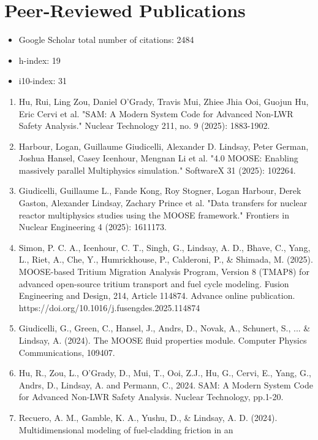 \section{Peer-Reviewed Publications}
\begin{itemize}
\item Google Scholar total number of citations: 2484
\item h-index: 19
\item i10-index: 31
\end{itemize}

\begin{enumerate}
  \item Hu, Rui, Ling Zou, Daniel O’Grady, Travis Mui, Zhiee Jhia Ooi, Guojun Hu, Eric Cervi et al. "SAM: A Modern System Code for Advanced Non-LWR Safety Analysis." Nuclear Technology 211, no. 9 (2025): 1883-1902.
  \item Harbour, Logan, Guillaume Giudicelli, Alexander D. Lindsay, Peter German, Joshua Hansel, Casey Icenhour, Mengnan Li et al. "4.0 MOOSE: Enabling massively parallel Multiphysics simulation." SoftwareX 31 (2025): 102264.
  \item Giudicelli, Guillaume L., Fande Kong, Roy Stogner, Logan Harbour, Derek Gaston, Alexander Lindsay, Zachary Prince et al. "Data transfers for nuclear reactor multiphysics studies using the MOOSE framework." Frontiers in Nuclear Engineering 4 (2025): 1611173.
  \item Simon, P. C. A., Icenhour, C. T., Singh, G., Lindsay, A. D., Bhave, C., Yang, L., Riet, A., Che, Y., Humrickhouse, P., Calderoni, P., \& Shimada, M. (2025). MOOSE-based Tritium Migration Analysis Program, Version 8 (TMAP8) for advanced open-source tritium transport and fuel cycle modeling. Fusion Engineering and Design, 214, Article 114874. Advance online publication. https://doi.org/10.1016/j.fusengdes.2025.114874
  \item Giudicelli, G., Green, C., Hansel, J., Andrs, D., Novak, A., Schunert,
    S., ... \& Lindsay, A. (2024). The MOOSE fluid properties module. Computer
    Physics Communications, 109407.
  \item Hu, R., Zou, L., O’Grady, D., Mui, T., Ooi, Z.J., Hu, G., Cervi, E.,
    Yang, G., Andrs, D., Lindsay, A. and Permann, C., 2024. SAM: A Modern
    System Code for Advanced Non-LWR Safety Analysis. Nuclear Technology,
    pp.1-20.
  \item Recuero, A. M., Gamble, K. A., Yushu, D., \& Lindsay,
    A. D. (2024). Multidimensional modeling of fuel-cladding friction in an

\end{enumerate}

